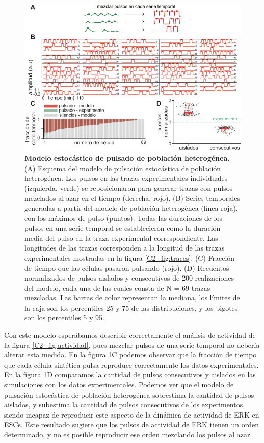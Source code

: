 \documentclass[./main.tex]{subfiles}
\begin{document}
 \begin{figure}
    \centering
    \includegraphics[width=1\columnwidth]{figures/chapter2/C2_pulsado_estocastico_heterog.pdf}\caption{\textbf{Modelo estocástico de pulsado de población heterogénea.}(A) Esquema del modelo de pulsación estocástica de población heterogénea. Los pulsos en las trazas experimentales individuales (izquierda, verde) se reposicionaron para generar trazas con pulsos mezclados al azar en el tiempo (derecha, rojo). (B) Series temporales generadas a partir del modelo de población heterogénea (línea roja), con los máximos de pulso (puntos). Todas las duraciones de los pulsos en una serie temporal se establecieron como la duración media del pulso en la traza experimental correspondiente. Las longitudes de las trazas corresponden a la longitud de las trazas experimentales mostradas en la figura \ref{C2_fig:traces}. (C) Fracción de tiempo que las células pasaron pulsando (rojo). (D) Recuentos normalizados de pulsos aislados y consecutivos de 200 realizaciones del modelo, cada una de las cuales consta de N = 69 trazas mezcladas. Las barras de color representan la mediana, los límites de la caja son los percentiles 25 y 75 de las distribuciones, y los bigotes son los percentiles 5 y 95. }
    \label{C2_fig:pulsos_estocasticos_heterog}
\end{figure}


Con este modelo esperábamos describir correctamente el análisis de actividad de la figura \ref{C2_fig:actividad}, pues mezclar pulsos de una serie temporal no debería alterar esta medida. En la figura \ref{C2_fig:pulsos_estocasticos_heterog}C podemos observar que la fracción de tiempo que cada célula sintética pulsa reproduce correctamente los datos experimentales. En la figura  \ref{C2_fig:pulsos_estocasticos_heterog}D comparamos la cantidad de pulsos consecutivos y aislados en las simulaciones con los datos experimentales. Podemos ver que el modelo de pulsación estocástica de población heterogénea sobrestima la cantidad de pulsos aislados, y subestima la cantidad de pulsos consecutivos de los experimentos, siendo incapaz de reproducir este aspecto de la dinámica de actividad de ERK en ESCs. Este resultado sugiere que los pulsos de actividad de ERK tienen un orden determinado, y no es posible reproducir ese orden mezclando los pulsos al azar.
\end{document}

